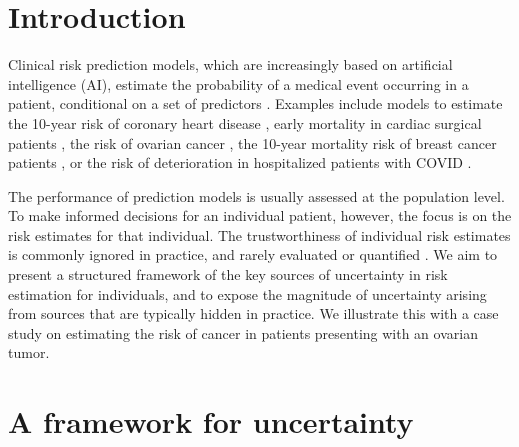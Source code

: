\newpage

\section{Introduction}

Clinical risk prediction models, which are increasingly based on artificial intelligence (AI), estimate the probability of a medical event occurring in a patient, conditional on a set of predictors \cite{steyerberg2019clinical}. Examples include models to estimate the 10-year risk of coronary heart disease \cite{hippisley-coxDevelopmentValidationQRISK32017}, early mortality in cardiac surgical patients \cite{nashefEuroSCOREII2012}, the risk of ovarian cancer \cite{vancalsterEvaluatingRiskOvarian2014}, the 10-year mortality risk of breast cancer patients \cite{candidodosreisUpdatedPREDICTBreast2017}, or the risk of deterioration in hospitalized patients with COVID \cite{guptaDevelopmentValidationISARIC2021}.

The performance of prediction models is usually assessed at the population level. To make informed decisions for an individual patient, however, the focus is on the risk estimates for that individual. The trustworthiness of individual risk estimates is commonly ignored in practice, and rarely evaluated or quantified \cite{altmanWhatWeMean2000}. We aim to present a structured framework of the key sources of uncertainty in risk estimation for individuals, and to expose the magnitude of uncertainty arising from sources that are typically hidden in practice. We illustrate this with a case study on estimating the risk of cancer in patients presenting with an ovarian tumor. 

\section{A framework for uncertainty}

